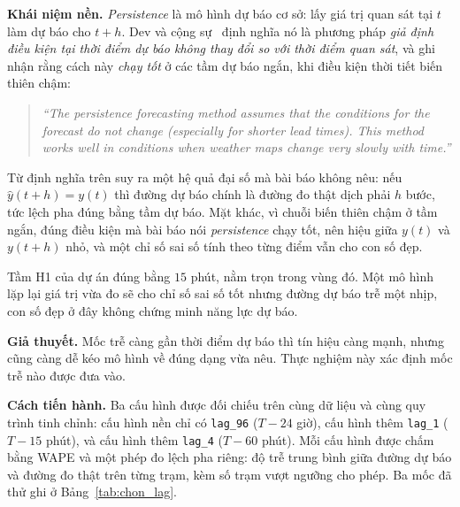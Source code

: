 \documentclass[12pt, a4paper]{report}
\begin{document}
\textbf{Khái niệm nền.} \textit{Persistence} là mô hình dự báo cơ sở: lấy giá trị quan sát
tại $t$ làm dự báo cho $t+h$. Dev và cộng sự~\cite{dev2018tes} định nghĩa nó là phương pháp
\textit{giả định điều kiện tại thời điểm dự báo không thay đổi so với thời điểm quan sát},
và ghi nhận rằng cách này \textit{chạy tốt} ở các tầm dự báo ngắn, khi điều kiện thời tiết
biến thiên chậm:

\begin{quote}\small
\textit{``The persistence forecasting method assumes that the conditions for the forecast do not change (especially for shorter lead times). This method works well in conditions when weather maps change very slowly with time.''}
\end{quote}


Từ định nghĩa trên suy ra một hệ quả đại số mà bài báo không nêu: nếu $\hat{y}(t+h) = y(t)$
thì đường dự báo chính là đường đo thật dịch phải $h$ bước, tức lệch pha đúng bằng
tầm dự báo. Mặt khác, vì chuỗi biến thiên chậm ở tầm ngắn, đúng điều kiện mà bài báo nói
\textit{persistence} chạy tốt, nên hiệu giữa $y(t)$ và $y(t+h)$ nhỏ, và một chỉ số sai số
tính theo từng điểm vẫn cho con số đẹp.

Tầm H1 của dự án đúng bằng $15$ phút, nằm trọn trong vùng đó. Một mô hình lặp lại giá trị vừa
đo sẽ cho chỉ số sai số tốt nhưng đường dự báo trễ một nhịp, con số đẹp
ở đây không chứng minh năng lực dự báo.

\textbf{Giả thuyết.} Mốc trễ càng gần thời điểm dự báo thì tín hiệu càng mạnh, nhưng cũng
càng dễ kéo mô hình về đúng dạng vừa nêu. Thực nghiệm này xác định mốc trễ nào được đưa vào.

\textbf{Cách tiến hành.} Ba cấu hình được đối chiếu trên cùng dữ liệu và cùng quy trình tinh
chỉnh: cấu hình nền chỉ có \texttt{lag\_96} ($T - 24$ giờ), cấu hình thêm \texttt{lag\_1}
($T - 15$ phút), và cấu hình thêm \texttt{lag\_4} ($T - 60$ phút). Mỗi cấu hình được chấm
bằng WAPE và một phép đo lệch pha riêng: độ trễ trung bình giữa đường dự báo và
đường đo thật trên từng trạm, kèm số trạm vượt ngưỡng cho phép. Ba mốc đã thử ghi ở
Bảng~\ref{tab:chon_lag}.
\end{document}
